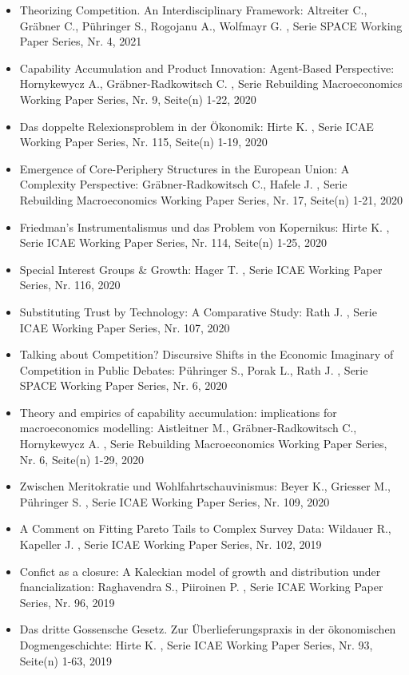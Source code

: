 \begin{itemize}
\item Theorizing Competition. An Interdisciplinary Framework: Altreiter C., Gräbner C., Pühringer S., Rogojanu A., Wolfmayr G. , Serie SPACE Working Paper Series, Nr. 4, 2021
\item Capability Accumulation and Product Innovation: Agent-Based Perspective: Hornykewycz A., Gräbner-Radkowitsch C. , Serie Rebuilding Macroeconomics Working Paper Series, Nr. 9, Seite(n) 1-22, 2020
\item Das doppelte Relexionsproblem in der Ökonomik: Hirte K. , Serie ICAE Working Paper Series, Nr. 115, Seite(n) 1-19, 2020
\item Emergence of Core-Periphery Structures in the European Union: A Complexity Perspective: Gräbner-Radkowitsch C., Hafele J. , Serie Rebuilding Macroeconomics Working Paper Series, Nr. 17, Seite(n) 1-21, 2020
\item Friedman’s Instrumentalismus und das Problem von Kopernikus: Hirte K. , Serie ICAE Working Paper Series, Nr. 114, Seite(n) 1-25, 2020
\item Special Interest Groups & Growth: Hager T. , Serie ICAE Working Paper Series, Nr. 116, 2020
\item Substituting Trust by Technology: A Comparative Study: Rath J. , Serie ICAE Working Paper Series, Nr. 107, 2020
\item Talking about Competition? Discursive Shifts in the Economic Imaginary of Competition in Public Debates: Pühringer S., Porak L., Rath J. , Serie SPACE Working Paper Series, Nr. 6, 2020
\item Theory and empirics of capability accumulation: implications for macroeconomics modelling: Aistleitner M., Gräbner-Radkowitsch C., Hornykewycz A. , Serie Rebuilding Macroeconomics Working Paper Series, Nr. 6, Seite(n) 1-29, 2020
\item Zwischen Meritokratie und Wohlfahrtschauvinismus: Beyer K., Griesser M., Pühringer S. , Serie ICAE Working Paper Series, Nr. 109, 2020
\item A Comment on Fitting Pareto Tails to Complex Survey Data: Wildauer R., Kapeller J. , Serie ICAE Working Paper Series, Nr. 102, 2019
\item Confict as a closure: A Kaleckian model of growth and distribution under fnancialization: Raghavendra S., Piiroinen P. , Serie ICAE Working Paper Series, Nr. 96, 2019
\item Das dritte Gossensche Gesetz. Zur Überlieferungspraxis in der ökonomischen Dogmengeschichte: Hirte K. , Serie ICAE Working Paper Series, Nr. 93, Seite(n) 1-63, 2019

\end{itemize}
